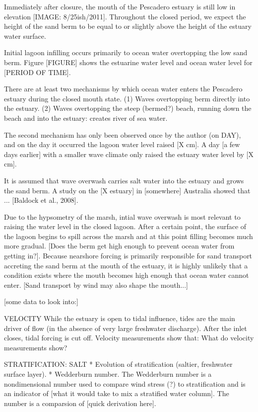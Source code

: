 Immediately after closure, the mouth of the Pescadero estuary is still low in elevation [IMAGE: 8/25ish/2011]. Throughout the closed period, we expect the height of the sand berm to be equal to or slightly above the height of the estuary water surface.

Initial lagoon infilling occurs primarily to ocean water overtopping the low sand berm. Figure [FIGURE] shows the estuarine water level and ocean water level for [PERIOD OF TIME]. 

There are at least two mechanisms by which ocean water enters the Pescadero estuary during the closed mouth state.
(1) Waves overtopping berm directly into the estuary.
(2) Waves overtopping the steep (bermed?) beach, running down the beach and into the estuary: creates river of sea water. 

The second mechanism has only been observed once by the author (on DAY), and on the day it occurred the lagoon water level raised [X cm]. A day [a few days earlier] with a smaller wave climate only raised the estuary water level by [X cm]. 

It is assumed that wave overwash carries salt water into the estuary and grows the sand berm. A study on the [X estuary] in [somewhere] Australia showed that ... [Baldock et al., 2008]. 



Due to the hypsometry of the marsh, intial wave overwash is most relevant to raising the water level in the closed lagoon. After a certain point, the surface of the lagoon begins to spill across the marsh and at this point filling becomes much more gradual. [Does the berm get high enough to prevent ocean water from getting in?]. Because nearshore forcing is primarily responsible for sand transport accreting the sand berm at the mouth of the estuary, it is highly unlikely that a condition exists where the mouth becomes high enough that ocean water cannot enter. [Sand transport by wind may also shape the mouth...]

[some data to look into:]



VELOCITY
While the estuary is open to tidal influence, tides are the main driver of flow (in the absence of very large freshwater discharge). After the inlet closes, tidal forcing is cut off. Velocity measurements show that: {What do velocity measurements show?}

STRATIFICATION:
SALT
* Evolution of stratification (saltier, freshwater surface layer). 
* Wedderburn number. The Wedderburn number is a nondimensional number used to compare wind stress (?) to stratification and is an indicator of [what it would take to mix a stratified water column]. The number is a comparsion of [quick derivation here]. 


